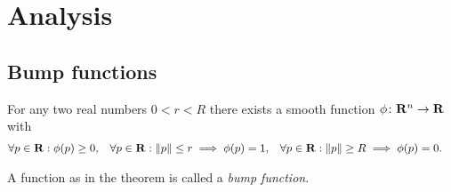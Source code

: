 \chapter{Analysis}

\section{Bump functions}
\label{sec:bump_functions}

\begin{thm}
  \label{thm:bump_function}
  For any two real numbers $0 < r < R$ there exists a smooth
  function $\phi\colon \mathbf{R}^n \to \mathbf{R}$ with
  \begin{align*}
    \forall p \in \mathbf{R}: \phi(p) & \ge 0, &
    \forall p \in \mathbf{R}: \lVert p\rVert \leq r \implies \phi(p) & = 1, &
    \forall p \in \mathbf{R}: \lVert p\rVert \geq R \implies \phi(p) & = 0.
  \end{align*}
\end{thm}

A function as in the theorem is called a \emph{bump function}.

